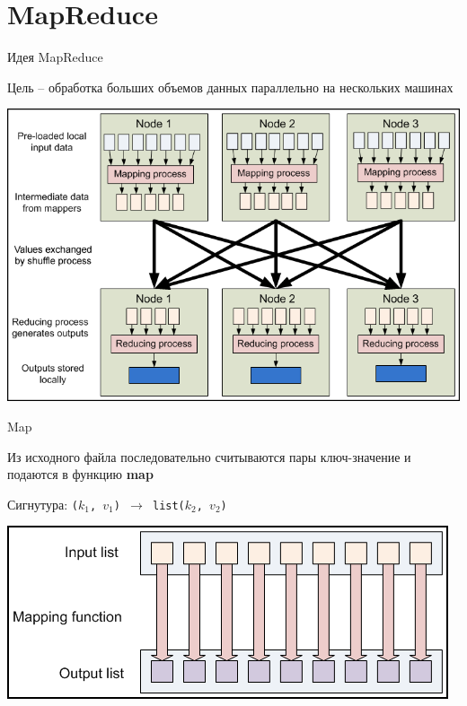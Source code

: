 \documentclass[10pt,a4paper]{beamer}
\begin{document}

\section{MapReduce}


\begin{frame}{Идея MapReduce}

{Цель -- обработка больших объемов данных параллельно на нескольких машинах}

\begin{center}
\includegraphics[scale=0.33]{images/mr.png}
\end{center}

\end{frame}


\begin{frame}{Map}

Из исходного файла последовательно считываются пары ключ-значение и подаются в функцию {\bf map}

\begin{center}
Сигнутура: \texttt{($k_1$, $v_1$) $\rightarrow$ list($k_2$, $v_2$) }

\vspace{2em}

\includegraphics[scale=0.33]{images/map.png}
\end{center}

\end{frame}
\end{document}
